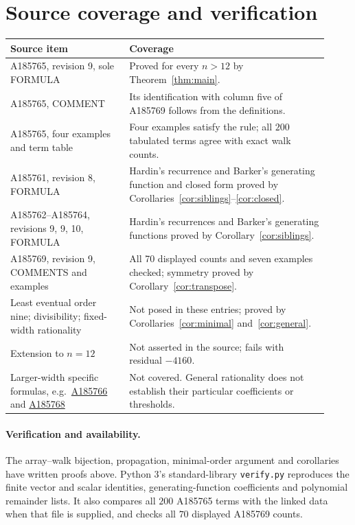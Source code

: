\documentclass[11pt]{article}
\begin{document}
\section{Source coverage and verification}
\noindent
\begin{tabular}{>{\raggedright\arraybackslash}p{0.34\linewidth}>{\raggedright\arraybackslash}p{0.58\linewidth}}
\toprule
Source item & Coverage\\
\midrule
A185765, revision 9, sole FORMULA & Proved for every $n>12$ by Theorem~\ref{thm:main}.\\
A185765, COMMENT & Its identification with column five of A185769
follows from the definitions.\\
A185765, four examples and term table & Four examples satisfy the rule;
all $200$ tabulated terms agree with exact walk counts.\\
A185761, revision 8, FORMULA & Hardin's recurrence and Barker's generating
function and closed form proved by Corollaries~\ref{cor:siblings}--\ref{cor:closed}.\\
A185762--A185764, revisions 9, 9, 10, FORMULA & Hardin's recurrences and
Barker's generating functions proved by Corollary~\ref{cor:siblings}.\\
A185769, revision 9, COMMENTS and examples & All 70 displayed counts
and seven examples checked; symmetry proved by Corollary~\ref{cor:transpose}.\\
Least eventual order nine; divisibility; fixed-width rationality & Not posed
in these entries; proved by Corollaries~\ref{cor:minimal} and~\ref{cor:general}.\\
Extension to $n=12$ & Not asserted in the source; fails with residual $-4160$.\\
Larger-width specific formulas, e.g.\ \href{https://oeis.org/A185766}{A185766}
and \href{https://oeis.org/A185768}{A185768} & Not covered. General rationality
does not establish their particular coefficients or thresholds.\\
\bottomrule
\end{tabular}


\paragraph{Verification and availability.}
The array--walk bijection, propagation, minimal-order argument and
corollaries have written proofs above. Python 3's standard-library
\texttt{verify.py} reproduces the finite vector and scalar identities,
generating-function coefficients and polynomial remainder lists.
It also compares all $200$ A185765 terms with the linked data when
that file is supplied, and checks all $70$ displayed A185769 counts.
\end{document}
